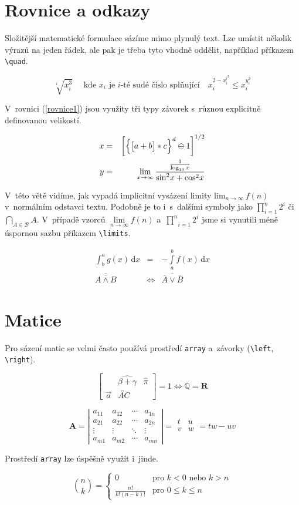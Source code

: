 \documentclass[a4paper, 11pt, twocolumn]{article}
\theoremstyle{definition}
\theoremstyle{definition}
\begin{document}
\section{Rovnice a odkazy}
Složitější matematické formulace sázíme mimo plynulý text. Lze umístit několik výrazů na jeden řádek, ale pak je třeba tyto vhodně oddělit, například příkazem \verb|\quad|.

\[ 
\sqrt[i]{x^3_i} \quad \text{ kde } x_i \text{ je }i\text{-té sudé číslo splňující}\quad x_i^{2-x_i^{i^2}} \leq x_i^{y_i^3}
\]

V~rovnici (\ref{rovnice1}) jsou využity tři typy závorek s~různou explicitně definovanou velikostí.

\begin{eqnarray}
x &=& \bigg[\Big\{\big[a + b \big] * c \Big\}^d\ominus 1 \bigg]^{1/2} \label{rovnice1}\\
y &=& \displaystyle\lim_{x\to\infty}\frac{ \frac{1}{\log_{10} x}}{\textup{sin}^2 x + \textup{cos}^2 x} \nonumber
\end{eqnarray}

V~této větě vidíme, jak vypadá implicitní vysázení limity $\displaystyle \mathrm{lim}_{n\rightarrow\infty}\,f(n)$ v~normálním odstavci textu. Podobně je to i~s~dalšími symboly jako $\prod_{i=1}^n 2^i$ či $\bigcap_{A \in\mathcal{B}} A$. V~případě vzorců $\textstyle\lim\limits_{n\to\infty} f(n)$ a~$\underset{i=1}{\overset{n}{\prod}} 2^i$ jsme si vynutili méně úspornou sazbu příkazem \verb|\limits|.

\begin{eqnarray}
\int_b^a g(x)\, \mathrm{d}x &=&- \displaystyle \int\limits_a^b f(x)\, \mathrm{d}x\\
\overline{\overline{A \wedge B}} &\Leftrightarrow& \overline{\overline{A} \vee \overline{B}}
\end{eqnarray}

\section{Matice}
Pro sázení matic se velmi často používá prostředí \texttt{array} a~závorky (\verb|\left|, \verb|\right|).

\[
\left[ 
\begin{array}{ccc}
&\widehat{\beta + \gamma}&
\hat{\pi}\\
\vec{a}
&\overleftrightarrow{AC}&
\end{array}
\right]
= 1 \Longleftrightarrow \mathbb{Q} = \mathbf{R}
\]

\[
\textbf{A} = \left| 
\begin{array}{cccc}
a_{11} & a_{12} & \cdots & a_{1n}\\
a_{21} & a_{22} & \cdots & a_{2n}\\
\vdots & \vdots & \ddots & \vdots\\
a_{m1} & a_{m2} & \cdots & a_{mn}
\end{array}
\right|
=
\begin{array}{cc}
t&u\\
v&w\\
\end{array}
= tw-uv
\]

Prostředí \texttt{array} lze úspěšně využít i~jinde.

\[
\binom{n}{k} =
\left\{
\begin{array}{ll}
0 & \text{pro } k<0 \text{ nebo } k>n\\
\frac{n!}{k!(n-k)!} & \text{pro } 0 \leq k \leq n
\end{array}
\right.
\]
\end{document}

